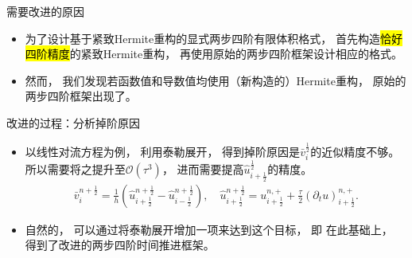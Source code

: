 \documentclass[aspectratio=169]{beamer}
\begin{document}
\begin{frame}{需要改进的原因}
  
  \begin{itemize}[<+->]
    \item 为了设计基于紧致Hermite重构的显式两步四阶有限体积格式，
          首先构造\hl{恰好四阶精度}的紧致Hermite重构，
          再使用原始的两步四阶框架设计相应的格式。
          
    \item 然而，
          我们发现若函数值和导数值均使用（新构造的）Hermite重构，
          原始的两步四阶框架出现了。
  \end{itemize}
  
  
\end{frame}

\begin{frame}{改进的过程：分析掉阶原因}
  
  \begin{itemize}[<+->]
    \item 以线性对流方程为例，
          利用泰勒展开，
          得到掉阶原因是$\bar v_{i}^{\frac 12}$的近似精度不够。
          所以需要将之提升至$\mathcal{O}(\tau^3)$，
          进而需要提高$\hat {u}^{\frac 12}_{i+\frac 12}$的精度。
          \begin{align*}
            \bar{v}_{i}^{n+\frac 12}=\frac{1}{h} \left(\hat u_{i+\frac 12}^{n+\frac 12}-\hat u_{i-\frac 12}^{n+\frac 12}\right), \quad
            \hat u_{i+\frac{1}{2}}^{n+\frac 12}
            =u_{i+\frac{1}{2}}^{n, +}+\frac{\tau}{2} \left({\partial_{t}}u\right)_{i+\frac{1}{2}}^{n, +}.
          \end{align*}
          
    \item 自然的，
          可以通过将泰勒展开增加一项来达到这个目标，
          即
          在此基础上，
          得到了改进的两步四阶时间推进框架。
  \end{itemize}
  
\end{frame}
\end{document}
